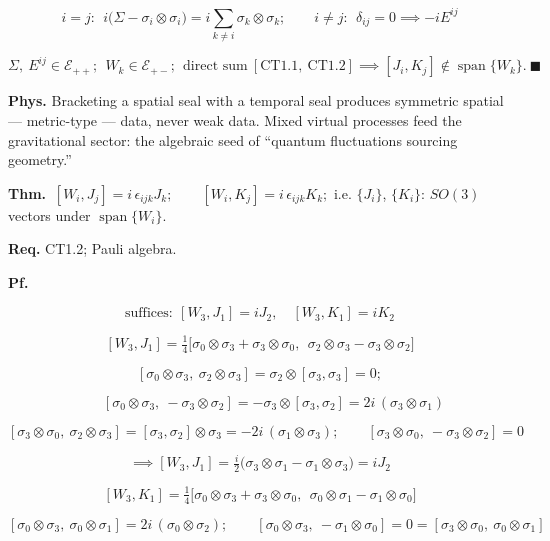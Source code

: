 \begin{theorem}
\[
i=j:\ \ i\bigl(\Sigma-\sigma_i\otimes\sigma_i\bigr)=i\!\!\sum_{k\ne i}\!\!\sigma_k\otimes\sigma_k;\qquad
i\ne j:\ \ \delta_{ij}=0\implies-iE^{ij}
\]

\[
\Sigma,\ E^{ij}\in\mathcal E_{++};\ \ W_k\in\mathcal E_{+-};\ \ \text{direct sum}\ [\mathrm{CT1.1},\ \mathrm{CT1.2}]\implies[J_i,K_j]\notin\operatorname{span}\{W_k\}.\ \blacksquare
\]

\textbf{Phys.} Bracketing a spatial seal with a temporal seal produces symmetric spatial — metric-type — data, never weak data. Mixed virtual processes feed the gravitational sector: the algebraic seed of “quantum fluctuations sourcing geometry.”

\end{theorem}

\begin{theorem}\label{tag:CT1-8}
\textbf{Thm.} $\ [W_i,J_j]=i\,\epsilon_{ijk}J_k;\qquad[W_i,K_j]=i\,\epsilon_{ijk}K_k;$ i.e. $\{J_i\}$, $\{K_i\}$: $SO(3)$ vectors under $\operatorname{span}\{W_i\}$.

\textbf{Req.} CT1.2; Pauli algebra.

\textbf{Pf.}

\[
\text{suffices}:\ [W_3,J_1]=iJ_2,\quad[W_3,K_1]=iK_2
\]

\[
[W_3,J_1]=\tfrac14\bigl[\sigma_0\otimes\sigma_3+\sigma_3\otimes\sigma_0,\ \ \sigma_2\otimes\sigma_3-\sigma_3\otimes\sigma_2\bigr]
\]

\[
[\sigma_0\otimes\sigma_3,\ \sigma_2\otimes\sigma_3]=\sigma_2\otimes[\sigma_3,\sigma_3]=0;
\]

\[
\qquad [\sigma_0\otimes\sigma_3,\ -\sigma_3\otimes\sigma_2]=-\sigma_3\otimes[\sigma_3,\sigma_2]=2i\,(\sigma_3\otimes\sigma_1)
\]

\[
[\sigma_3\otimes\sigma_0,\ \sigma_2\otimes\sigma_3]=[\sigma_3,\sigma_2]\otimes\sigma_3=-2i\,(\sigma_1\otimes\sigma_3);\qquad
[\sigma_3\otimes\sigma_0,\ -\sigma_3\otimes\sigma_2]=0
\]

\[
\implies[W_3,J_1]=\tfrac i2\bigl(\sigma_3\otimes\sigma_1-\sigma_1\otimes\sigma_3\bigr)=iJ_2
\]

\[
[W_3,K_1]=\tfrac14\bigl[\sigma_0\otimes\sigma_3+\sigma_3\otimes\sigma_0,\ \ \sigma_0\otimes\sigma_1-\sigma_1\otimes\sigma_0\bigr]
\]

\[
[\sigma_0\otimes\sigma_3,\ \sigma_0\otimes\sigma_1]=2i\,(\sigma_0\otimes\sigma_2);\qquad
[\sigma_0\otimes\sigma_3,\ -\sigma_1\otimes\sigma_0]=0=[\sigma_3\otimes\sigma_0,\ \sigma_0\otimes\sigma_1]
\]


\end{theorem}
